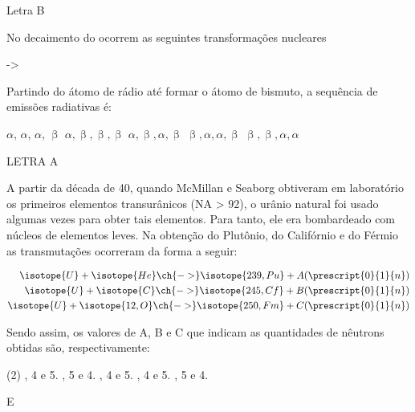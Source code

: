 \documentclass[9 pt]{scrartcl}
\def\PQ{0.84} %
\begin{document}
\begin{solution}
Letra B
\end{solution}


\begin{exercise}[points=1.0]
No decaimento do  ocorrem as seguintes transformações nucleares
\begin{reaction*}
 -> 
\end{reaction*}

Partindo do átomo de rádio até formar o átomo de bismuto, a sequência de emissões radiativas é:

\begin{choice}
\choice \(\alpha\), \(\alpha\), \(\alpha\), \(\upbeta\)
\choice \(\alpha, \upbeta, \upbeta, \upbeta\)
\choice \(\alpha, \upbeta, \alpha, \upbeta\)
\choice \(\upbeta, \alpha, \alpha, \upbeta\)
\choice \(\upbeta, \upbeta, \alpha, \alpha\)
\end{choice}
\end{exercise}
\begin{solution}
LETRA A
\end{solution}




\begin{exercise}[points=\PQ]
A partir da década de 40, quando McMillan e Seaborg obtiveram em laboratório os primeiros elementos transurânicos (NA > 92), o urânio natural foi usado algumas vezes para obter tais elementos. Para tanto, ele era bombardeado com núcleos de elementos leves. Na obtenção do Plutônio, do Califórnio e do Férmio as transmutações ocorreram da forma a seguir:

\begin{align*}
\isotope{U} + \isotope{He} \ch{->} \isotope{239,Pu} + A (\prescript{0}{1}{n})\\
\isotope{U} + \isotope{C} \ch{->} \isotope{245,Cf} + B (\prescript{0}{1}{n})\\
\isotope{U} + \isotope{12,O} \ch{->} \isotope{250,Fm} + C (\prescript{0}{1}{n})\\
\end{align*}

Sendo assim, os valores de A, B e C que indicam as quantidades de nêutrons obtidas são, respectivamente:

\begin{choice}(2)
, 4 e 5.
, 5 e 4.
, 4 e 5.
, 4 e 5.
, 5 e 4.
\end{choice}
\end{exercise}
\begin{solution}
E
\end{solution}
\end{document}
